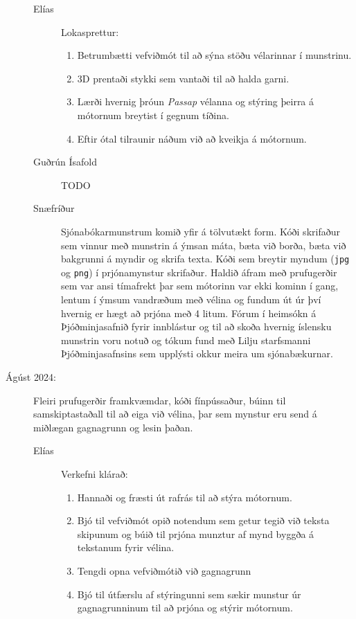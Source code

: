 \documentclass[a4paper,12pt,twoside]{article}
\begin{document}
\begin{description}
    \begin{description}
        \item[Elías] Lokasprettur:
        \begin{enumerate}
            \item Betrumbætti vefviðmót til að sýna stöðu vélarinnar í munstrinu.
            \item 3D prentaði stykki sem vantaði til að halda garni.
            \item Lærði hvernig þróun \textit{Passap} vélanna og stýring þeirra á mótornum breytist í gegnum tíðina.
            \item Eftir ótal tilraunir náðum við að kveikja á mótornum.
        \end{enumerate}
        \item[Guðrún Ísafold] TODO
        \item[Snæfríður] Sjónabókarmunstrum komið yfir á tölvutækt form. Kóði skrifaður sem vinnur með munstrin á ýmsan máta, bæta við borða, bæta við bakgrunni á myndir og skrifa texta. Kóði sem breytir myndum (\texttt{jpg} og \texttt{png}) í prjónamynstur skrifaður. Haldið áfram með prufugerðir sem var ansi tímafrekt þar sem mótorinn var ekki kominn í gang, lentum í ýmsum vandræðum með vélina og fundum út úr því hvernig er hægt að prjóna með 4 litum. Fórum í heimsókn á Þjóðminjasafnið fyrir innblástur og til að skoða hvernig íslensku munstrin voru notuð og tókum fund með Lilju starfsmanni Þjóðminjasafnsins sem upplýsti okkur meira um sjónabækurnar.
    \end{description}
    \item[Ágúst 2024:] Fleiri prufugerðir framkvæmdar, kóði fínpússaður, búinn til samskiptastaðall til að eiga við vélina, þar sem mynstur eru send á miðlægan gagnagrunn og lesin þaðan.
    \begin{description}
        \item[Elías] Verkefni klárað:
        \begin{enumerate}
            \item Hannaði og fræsti út rafrás til að stýra mótornum.
            \item Bjó til vefviðmót opið notendum sem getur tegið við teksta skipunum og búið til prjóna munztur af mynd byggða á tekstanum fyrir vélina. 
            \item Tengdi opna vefviðmótið við gagnagrunn
            \item Bjó til útfærslu af stýringunni sem sækir munstur úr gagnagrunninum til að prjóna og stýrir mótornum.

\end{enumerate}
\end{description}
\end{description}
\end{document}
